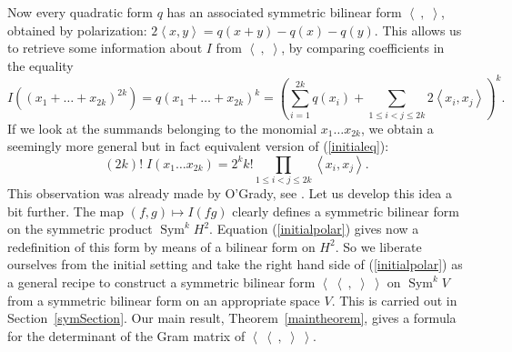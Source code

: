 \documentclass{amsart}
\DeclareMathOperator{\Sym}{Sym}
\newcommand{\bra}{\left<\!\!\!\:\left<}
\newcommand{\ket}{\right>\!\!\!\:\right>}
\theoremstyle{plain}
\theoremstyle{definition}
\theoremstyle{remark}
\begin{document}
Now every quadratic form $q$ has an associated symmetric bilinear form $\left<\ ,\;\right>$, obtained by polarization: $2\left<x,y\right> = q(x+y)-q(x)-q(y)$. This allows us to retrieve some information about $I$ from $\left<\ ,\;\right>$,
by comparing coefficients in the equality
\begin{equation*}
I\!\left((x_1+\ldots+x_{2k})^{2k}\right) = q(x_1+\ldots+x_{2k})^{k} = \left(\sum\limits_{i=1}^{2k} q(x_i) +\!\!\!\sum\limits_{1\leq i<j\leq 2k}\!\!2 \left<x_i,x_j\right>  \right)^k.
\end{equation*}
If we look at the summands belonging to the monomial $x_1\ldots x_{2k}$, we obtain a seemingly more general but in fact equivalent version of (\ref{initialeq}):
\begin{equation} \label{initialpolar}
 (2k)!\; I\!\left(x_1\ldots x_{2k}\right) = 2^k k! \!\!\prod\limits_{1\leq i<j\leq 2k}\!\!\left<x_i,x_j\right>.
\end{equation}
This observation was already made by O'Grady, see \cite[Eq.~3.2.4]{OGrady}. Let us develop this idea a bit further. The map $(f,g) \mapsto I(fg)$ clearly defines a symmetric bilinear form on the symmetric product $\Sym^kH^2$.
Equation (\ref{initialpolar}) gives now a redefinition of this form by means of a bilinear form on $H^2$. So we liberate ourselves from the initial setting and take the right hand side of (\ref{initialpolar}) as a general recipe to construct a symmetric bilinear form $\bra\ ,\;\ket$ on $\Sym^kV$ from a symmetric bilinear form on an appropriate space $V$. This is carried out in Section~\ref{symSection}. Our main result, Theorem~\ref{maintheorem}, gives a formula for the determinant of the Gram matrix of $\bra\ ,\;\ket$. 
\end{document}

